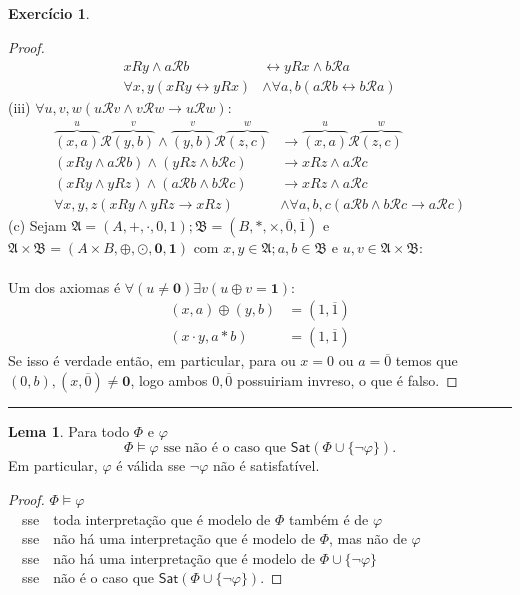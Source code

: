 \documentclass[11pt]{article}
\theoremstyle{definition}
\newtheorem{exer}{Exercício}
\newtheorem{lemma}{Lema}
\newcommand{\sse}{\leftrightarrow}
\newcommand{\mc}[1]{\mathcal{#1}}
\newcommand{\mf}[1]{\mathfrak{#1}}
\newcommand{\msf}[1]{\mathsf{#1}}
\newcommand{\ol}[1]{\overline{#1}}
\begin{document}
\begin{exer}
\begin{proof}
\begin{align*}
    xRy\wedge a\mc{R}b & \sse yRx\wedge b\mc{R}a\\
    \forall x,y(xRy\sse yRx) & \wedge \forall a,b(a\mc{R}b\sse b\mc{R}a)
\end{align*}
(iii) $\forall u,v,w(u\mathscr{R} v\wedge v\mathscr{R} w\to u\mathscr{R}w)$:
\begin{align*}
    \overbrace{(x,a)}^u\mathscr{R}\overbrace{(y,b)}^v\wedge \overbrace{(y,b)}^v\mathscr{R}\overbrace{(z,c)}^w & \to \overbrace{(x,a)}^u\mathscr{R}\overbrace{(z,c)}^w\\
    (xRy\wedge a\mc{R}b)\wedge(yRz\wedge b\mc{R}c) & \to xRz\wedge a\mc{R}c\\
    (xRy\wedge yRz)\wedge(a\mc{R}b\wedge b\mc{R}c) & \to xRz\wedge a\mc{R}c\\
    \forall x,y,z(xRy\wedge yRz\to xRz) & \wedge\forall a,b,c(a\mc{R}b\wedge b\mc{R}c\to a\mc{R}c)
\end{align*}
(c) Sejam $\mf{A}=(A,+,\cdot,0,1);\mf{B}=(B,*,\times,\ol{0},\ol{1})$ e $\mf{A}\times\mf{B}=(A\times B,\oplus,\odot,\mathbf{0},\mathbf{1})$ com $x,y\in\mf{A};a,b\in\mf{B}$ e $u,v\in\mf{A}\times\mf{B}$:\\\\
Um dos axiomas é $\forall(u\ne\mathbf{0})\exists v(u\oplus v=\mathbf{1})$:
\begin{align*}
    (x,a)\oplus(y,b) & =(1,\ol{1})\\
    (x\cdot y,a*b) & = (1,\ol{1})
\end{align*}
Se isso é verdade então, em particular, para ou $x=0$ ou $a=\ol{0}$ temos que $(0,b),(x,\ol{0})\ne\mathbf{0}$, logo ambos $0,\ol{0}$ possuiriam invreso, o que é falso.
\end{proof}
\end{exer}

\hrule

\begin{lemma}
Para todo $\Phi$ e $\varphi$
\[
\Phi\vDash\varphi\text{ sse não é o caso que }\msf{Sat}(\Phi\cup\{\neg\varphi\}).
\]
Em particular, $\varphi$ é válida sse $\neg\varphi$ não é satisfatível.

\begin{proof}
$\Phi\vDash\varphi$\\
~~sse~~toda interpretação que é modelo de $\Phi$ também é de $\varphi$\\
~~sse~~não há uma interpretação que é modelo de $\Phi$, mas não de $\varphi$\\
~~sse~~não há uma interpretação que é modelo de $\Phi\cup\{\neg\varphi\}$\\
~~sse~~não é o caso que $\msf{Sat}(\Phi\cup\{\neg\varphi\})$.
\end{proof}
\end{lemma}
\end{document}
